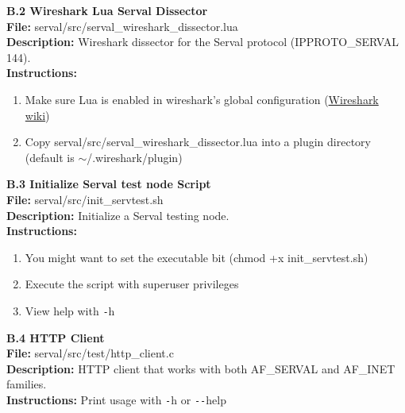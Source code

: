\newpage
{}
{}
{\huge \bf \noindent B.2 Wireshark Lua Serval Dissector}\\[0.5cm]
\textbf{File:} serval/src/serval\_wireshark\_dissector.lua\\
\textbf{Description:} Wireshark dissector for the Serval protocol (IPPROTO\_SERVAL 144).\\
\textbf{Instructions: }
\begin{enumerate} \itemsep1pt \parskip0pt 
	\item Make sure Lua is enabled in wireshark's global configuration (\href{http://wiki.wireshark.org/Lua}{Wireshark wiki})
	\item Copy serval/src/serval\_wireshark\_dissector.lua into a plugin directory (default is $\sim$/.wireshark/plugin)\\[0.5cm]
\end{enumerate}


\newpage
{}
{}
{\huge \bf \noindent B.3 Initialize Serval test node Script}\\[0.5cm]
\textbf{File:} serval/src/init\_servtest.sh\\
\textbf{Description:} Initialize a Serval testing node.\\
\textbf{Instructions: }
\begin{enumerate} \itemsep1pt \parskip0pt 
	\item You might want to set the executable bit (chmod +x init\_servtest.sh)
	\item Execute the script with superuser privileges
	\item View help with \texttt{-}h\\[0.5cm]
\end{enumerate}


\newpage
{}
{}
{\huge \bf \noindent B.4 HTTP Client}\\[0.5cm]
\textbf{File:} serval/src/test/http\_client.c\\
\textbf{Description:} HTTP client that works with both AF\_SERVAL and AF\_INET families.\\
\textbf{Instructions: } Print usage with \texttt{-}h or \texttt{{-}{-}}help\\[0.5cm]


